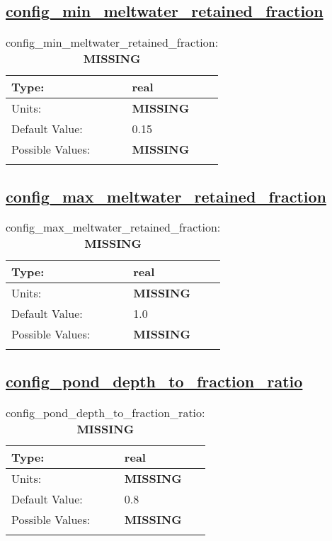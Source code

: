\subsection[config\_min\_meltwater\_retained\_fraction]{\hyperref[sec:nm_tab_meltponds]{config\_min\_meltwater\_retained\_fraction}}
\label{subsec:nm_sec_config_min_meltwater_retained_fraction}
\begin{center}
\begin{longtable}{| p{2.0in} || p{4.0in} |}
    \hline
    Type: & real \\
    \hline
    Units: & {\bf \color{red} MISSING} \\
    \hline
    Default Value: & 0.15 \\
    \hline
    Possible Values: & {\bf \color{red} MISSING} \\
    \hline
    \caption{config\_min\_meltwater\_retained\_fraction: {\bf \color{red} MISSING}}
\end{longtable}
\end{center}
\subsection[config\_max\_meltwater\_retained\_fraction]{\hyperref[sec:nm_tab_meltponds]{config\_max\_meltwater\_retained\_fraction}}
\label{subsec:nm_sec_config_max_meltwater_retained_fraction}
\begin{center}
\begin{longtable}{| p{2.0in} || p{4.0in} |}
    \hline
    Type: & real \\
    \hline
    Units: & {\bf \color{red} MISSING} \\
    \hline
    Default Value: & 1.0 \\
    \hline
    Possible Values: & {\bf \color{red} MISSING} \\
    \hline
    \caption{config\_max\_meltwater\_retained\_fraction: {\bf \color{red} MISSING}}
\end{longtable}
\end{center}
\subsection[config\_pond\_depth\_to\_fraction\_ratio]{\hyperref[sec:nm_tab_meltponds]{config\_pond\_depth\_to\_fraction\_ratio}}
\label{subsec:nm_sec_config_pond_depth_to_fraction_ratio}
\begin{center}
\begin{longtable}{| p{2.0in} || p{4.0in} |}
    \hline
    Type: & real \\
    \hline
    Units: & {\bf \color{red} MISSING} \\
    \hline
    Default Value: & 0.8 \\
    \hline
    Possible Values: & {\bf \color{red} MISSING} \\
    \hline
    \caption{config\_pond\_depth\_to\_fraction\_ratio: {\bf \color{red} MISSING}}
\end{longtable}
\end{center}
